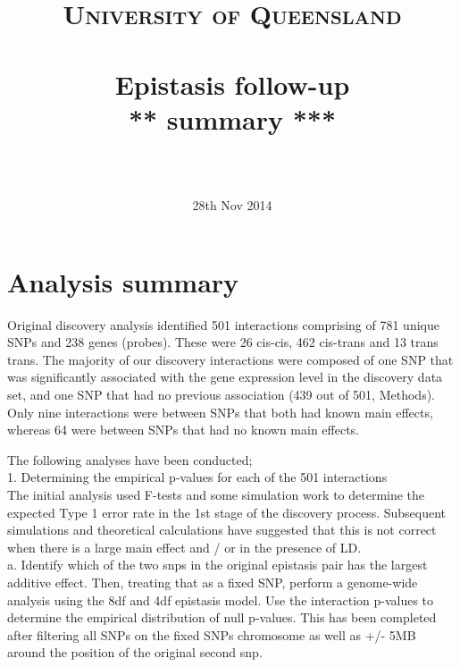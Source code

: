 \documentclass[paper=a4, fontsize=11pt]{scrartcl}					%
\title{
		\usefont{OT1}{bch}{b}{n}
		\normalfont \normalsize \textsc{University of Queensland} \\ [25pt]
		\horrule{0.5pt} \\[0.4cm]
		\huge Epistasis follow-up \\[0.3cm]
        \huge *** summary *** \\
		\horrule{2pt} \\[0.5cm]
		\date{28th Nov 2014}
}
\numberwithin{equation}{section}									%
\numberwithin{figure}{section}										%
\numberwithin{table}{section}										%
\begin{document}


\maketitle



\newpage
\section{Analysis summary}
\noindent


Original discovery analysis identified 501 interactions comprising of 781 unique SNPs and 238 genes (probes). These were 26 cis-cis, 462 cis-trans and 13 trans trans. The majority of our discovery interactions were composed of one SNP that was significantly associated with the gene expression level in the discovery data set, and one SNP that had no previous association (439 out of 501, Methods). Only nine interactions were between SNPs that both had known main effects, whereas 64 were between SNPs that had no known main effects.  

The following analyses have been conducted; \\

1. Determining the empirical p-values for each of the 501 interactions \\

The initial analysis used F-tests and some simulation work to determine the expected Type 1 error rate in the 1st stage of the discovery process. Subsequent simulations and theoretical calculations have suggested that this is not correct when there is a large main effect and / or in the presence of LD. \\

a. Identify which of the two snps in the original epistasis pair has the largest additive effect. Then, treating that as a fixed SNP, perform a genome-wide analysis using the 8df and 4df epistasis model. Use the interaction p-values to determine the empirical distribution of null p-values. This has been completed after filtering all SNPs on the fixed SNPs chromosome as well as +/- 5MB around the position of the original second snp.  \\
\end{document}

